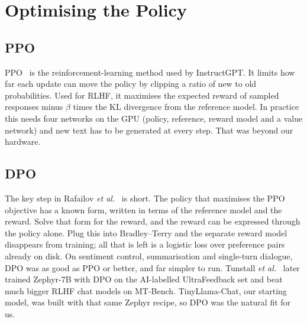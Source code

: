 \section{Optimising the Policy}
\label{sec:lit-po}

\subsection{PPO}
PPO~\cite{schulman2017ppo} is the reinforcement-learning method used by InstructGPT. It limits how far each update can move the policy by clipping a ratio of new to old probabilities. Used for RLHF, it maximises the expected reward of sampled responses minus $\beta$ times the KL divergence from the reference model. In practice this needs four networks on the GPU (policy, reference, reward model and a value network) and new text has to be generated at every step. That was beyond our hardware.

\subsection{DPO}
The key step in Rafailov \emph{et al.}~\cite{rafailov2023dpo} is short. The policy that maximises the PPO objective has a known form, written in terms of the reference model and the reward. Solve that form for the reward, and the reward can be expressed through the policy alone. Plug this into Bradley--Terry and the separate reward model disappears from training; all that is left is a logistic loss over preference pairs already on disk. On sentiment control, summarisation and single-turn dialogue, DPO was as good as PPO or better, and far simpler to run. Tunstall \emph{et al.}~\cite{tunstall2023zephyr} later trained Zephyr-7B with DPO on the AI-labelled UltraFeedback set and beat much bigger RLHF chat models on MT-Bench. TinyLlama-Chat, our starting model, was built with that same Zephyr recipe, so DPO was the natural fit for us.

